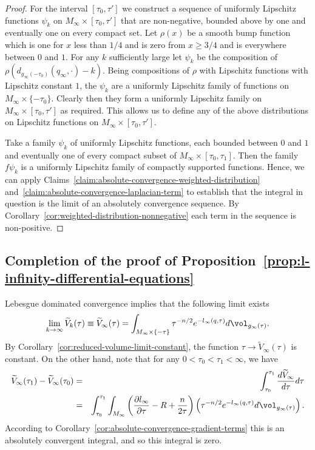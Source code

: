 \begin{proof}
For the interval $[\tau_0,\tau']$  we construct a sequence of
uniformly Lipschitz functions $\psi_k$ on $M_\infty\times
[\tau_0,\tau']$ that are non-negative, bounded above by one and
eventually one on every compact set. Let $\rho(x)$ be a smooth bump
function which is one for $x$ less than $1/4$ and is zero from $x\ge
3/4$ and is everywhere between $0$ and $1$. For any $k$ sufficiently
large let $\psi_k$ be the composition of
$\rho(d_{g_\infty(-\tau_0)}(q_\infty,\cdot)-k)$. Being compositions
of $\rho$ with Lipschitz functions with Lipschitz constant $1$, the
$\psi_k$ are a uniformly Lipschitz family of functions on
$M_\infty\times\{-\tau_0\}$. Clearly then they form a uniformly
Lipschitz family on $M_\infty\times [\tau_0,\tau']$ as required.
This allows us to define any of the above distributions on Lipschitz
functions on $M_\infty\times [\tau_0,\tau']$.

Take a family $\psi_k$ of uniformly Lipschitz functions, each
bounded between $0$ and $1$ and eventually one of every compact
subset of $M_\infty\times [\tau_0,\tau_1]$. Then the family
$f\psi_k$ is a uniformly Lipschitz family of compactly supported
functions. Hence, we can apply Claims~\ref{claim:absolute-convergence-weighted-distribution}
and~\ref{claim:absolute-convergence-laplacian-term} to establish that the integral in question is the
limit of an absolutely convergence sequence. By
Corollary~\ref{cor:weighted-distribution-nonnegative} each term in the sequence is non-positive.
\end{proof}



 \subsection{Completion of the proof of
Proposition~{\ref{prop:l-infinity-differential-equations}}}\label{sect9.2.5}



Lebesgue dominated convergence implies that the following limit
exists
$$\lim_{k\rightarrow\infty}\widetilde V_k(\tau)\equiv\widetilde V_\infty(\tau)=\int_{M_\infty\times\{-\tau\}}\tau^{-n/2}e^{-
l_\infty(q,\tau)}d\vol_{g_\infty(\tau)}.$$ By Corollary~\ref{cor:reduced-volume-limit-constant}, the function $\tau\rightarrow
\widetilde V_\infty(\tau)$ is constant. On the other hand, note that
for any $0< \tau_0<\tau_1<\infty$, we have
\begin{eqnarray*}
\widetilde V_\infty(\tau_1)-\widetilde V_\infty(\tau_0) & = &
\int_{\tau_0}^{\tau_1}\frac{d\widetilde
V_\infty}{d\tau}d\tau \\
& = & \int_{\tau_0}^{\tau_1}\int_{M_\infty}\left(\frac{\partial
l_\infty}{\partial \tau}-R+\frac{n}{2\tau}\right)
\left(\tau^{-n/2}e^{-l_\infty(q,\tau)}d\vol_{g_\infty(\tau)}\right).\end{eqnarray*} According to
Corollary~\ref{cor:absolute-convergence-gradient-terms} this is an absolutely convergent integral,
and so  this integral is zero.

